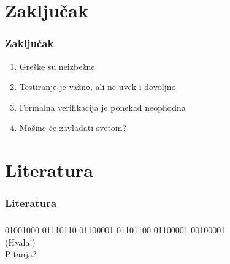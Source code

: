\documentclass{beamer}
\begin{document}
\section{Zaključak}
\begin{frame}
\frametitle{Zaključak}
\begin{enumerate}
\item Greške su neizbežne
\item Testiranje je važno, ali ne uvek i dovoljno
\item Formalna verifikacija je ponekad neophodna
\item Mašine će zavladati svetom?
\end{enumerate}
\end{frame}

\section{Literatura}
\begin{frame}

\nocite{quinn_ethics}
\nocite{laski2009software}
\nocite{pham_reliability}
\nocite{Bayou}

\frametitle{Literatura}


\end{frame}

\begin{frame}
\frametitle{}
\begin{center}
{\Huge 01001000 01110110 01100001 01101100 01100001 00100001} \\
{\Huge (Hvala!)} \\ 
\bigskip
\bigskip
{\Huge Pitanja?}
\end{center}
\end{frame}
\end{document}
